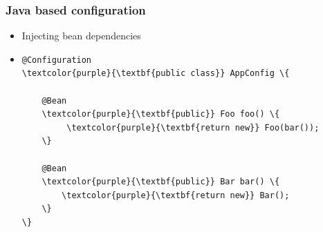 \documentclass[10pt,xcolor=pdflatex, table]{beamer}
\begin{document}
\begin{frame}[fragile]\frametitle{Java based configuration}
	\begin{itemize}
		\item Injecting bean dependencies
        \item[]
        	\medskip
            \begin{Verbatim}[fontsize=\footnotesize, commandchars=\\\{\}]
@Configuration
\textcolor{purple}{\textbf{public class}} AppConfig \{

    @Bean
    \textcolor{purple}{\textbf{public}} Foo foo() \{
         \textcolor{purple}{\textbf{return new}} Foo(bar());
    \}
    
    @Bean
    \textcolor{purple}{\textbf{public}} Bar bar() \{
        \textcolor{purple}{\textbf{return new}} Bar();
    \}
\}
			\end{Verbatim}
	\end{itemize}
\end{frame}
\end{document}
